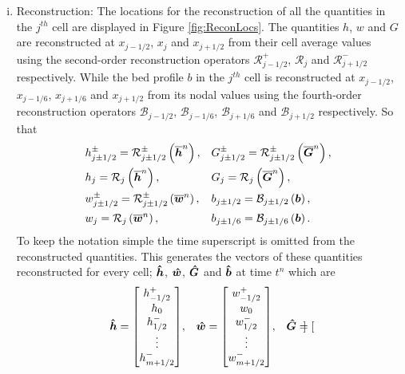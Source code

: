 \begin{enumerate}[(i)]
	\item Reconstruction: The locations for the reconstruction of all the quantities in the $j^{th}$ cell are displayed in Figure \ref{fig:ReconLocs}. The quantities $h$, $w$ and $G$ are reconstructed at $x_{j-1/2}$, $x_{j}$ and $x_{j+1/2}$ from their cell average values using the second-order reconstruction operators $\mathcal{R}^+_{j-1/2}$, $\mathcal{R}_{j}$ and $\mathcal{R}^-_{j+1/2}$ respectively. While the bed profile $b$ in the $j^{th}$ cell is reconstructed at $x_{j-1/2}$, $x_{j-1/6}$, $x_{j+1/6}$ and $x_{j+1/2}$ from its nodal values using the fourth-order reconstruction operators $\mathcal{B}_{j-1/2}$, $\mathcal{B}_{j-1/6}$, $\mathcal{B}_{j+1/6}$ and $\mathcal{B}_{j+1/2}$ respectively. So that
	\begin{align*}	&h^\pm_{j \pm 1/2} = \mathcal{R}^\pm_{j \pm 1/2} \left(\overline{\boldsymbol{h}}^n\right),&& G^\pm_{j\pm 1/2} = \mathcal{R}^\pm_{j\pm 1/2} \left(\overline{\boldsymbol{G}}^n\right),\\
	&h_j = \mathcal{R}_{j} \left(\overline{\boldsymbol{h}}^n\right),&& G_j = \mathcal{R}_{j} \left(\overline{\boldsymbol{G}}^n\right),\\
	&w^\pm_{j\pm 1/2} = \mathcal{R}^\pm_{j \pm1/2} \left(\overline{\boldsymbol{w}}^n\right), &&b_{j\pm 1/2} = \mathcal{B}_{j\pm 1/2} \left(\boldsymbol{b}\right),  \\
	&w_{j} = \mathcal{R}_{j} \left(\overline{\boldsymbol{w}}^n\right), &&b_{j\pm 1/6} = \mathcal{B}_{j\pm 1/6}  \left(\boldsymbol{b}\right).\\
	\end{align*}
	To keep the notation simple the time superscript is omitted from the reconstructed quantities.	This generates the vectors of these quantities reconstructed for every cell; $\boldsymbol{\hat{h}}$, $\boldsymbol{\hat{w}}$, $\boldsymbol{\hat{G}}$ and $\boldsymbol{\hat{b}}$ at time $t^n$ which are
	\begin{align*}\boldsymbol{\hat{h}} = \begin{bmatrix}
	h^+_{-1/2} \\ h_0 \\ h^-_{1/2} \\ \vdots  \\ h^-_{m+1/2}\end{bmatrix} &,&
	\boldsymbol{\hat{w}} = \begin{bmatrix}
	w^+_{-1/2} \\ w_0 \\ w^-_{1/2}  \\ \vdots  \\ w^-_{m+1/2}\end{bmatrix} &,& \boldsymbol{\hat{G}} = \begin{bmatrix}

\end{bmatrix}
\end{align*}
\end{enumerate}
